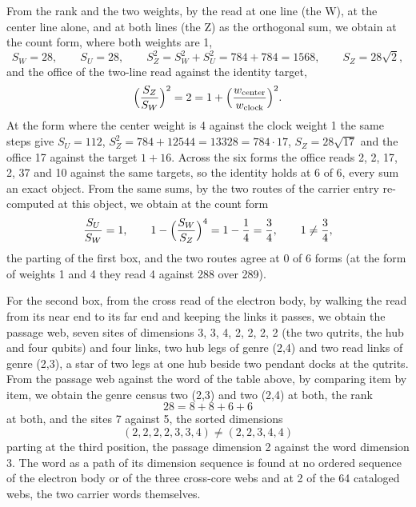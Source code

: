 \begin{chproof}[exact]
From the rank and the two weights, by the read at one line (the W), at the center line alone, and at both lines (the Z) as the orthogonal sum, we obtain at the count form, where both weights are 1,
\begin{equation}
S_W = 28, \qquad S_U = 28, \qquad S_Z^{2} = S_W^{2} + S_U^{2} = 784 + 784 = 1568, \qquad S_Z = 28\sqrt{2},
\end{equation}
and the office of the two-line read against the identity target,
\begin{equation}
\Bigl(\frac{S_Z}{S_W}\Bigr)^{2} = 2 = 1 + \Bigl(\frac{w_{\mathrm{center}}}{w_{\mathrm{clock}}}\Bigr)^{2} .
\end{equation}
At the form where the center weight is 4 against the clock weight 1 the same steps give $S_U = 112$, $S_Z^{2} = 784 + 12544 = 13328 = 784 \cdot 17$, $S_Z = 28\sqrt{17}$ and the office 17 against the target $1 + 16$. Across the six forms the office reads 2, 2, 17, 2, 37 and 10 against the same targets, so the identity holds at 6 of 6, every sum an exact object. From the same sums, by the two routes of the carrier entry re-computed at this object, we obtain at the count form
\begin{equation}
\frac{S_U}{S_W} = 1 , \qquad 1 - \Bigl(\frac{S_W}{S_Z}\Bigr)^{4} = 1 - \frac{1}{4} = \frac{3}{4} , \qquad 1 \neq \frac{3}{4} ,
\end{equation}
the parting of the first box, and the two routes agree at 0 of 6 forms (at the form of weights 1 and 4 they read 4 against 288 over 289).

For the second box, from the cross read of the electron body, by walking the read from its near end to its far end and keeping the links it passes, we obtain the passage web, seven sites of dimensions 3, 3, 4, 2, 2, 2, 2 (the two qutrits, the hub and four qubits) and four links, two hub legs of genre (2,4) and two read links of genre (2,3), a star of two legs at one hub beside two pendant docks at the qutrits. From the passage web against the word of the table above, by comparing item by item, we obtain the genre census two (2,3) and two (2,4) at both, the rank
\begin{equation}
28 = 8 + 8 + 6 + 6
\end{equation}
at both, and the sites 7 against 5, the sorted dimensions
\begin{equation}
(2,2,2,2,3,3,4) \neq (2,2,3,4,4)
\end{equation}
parting at the third position, the passage dimension 2 against the word dimension 3. The word as a path of its dimension sequence is found at no ordered sequence of the electron body or of the three cross-core webs and at 2 of the 64 cataloged webs, the two carrier words themselves.


\end{chproof}
